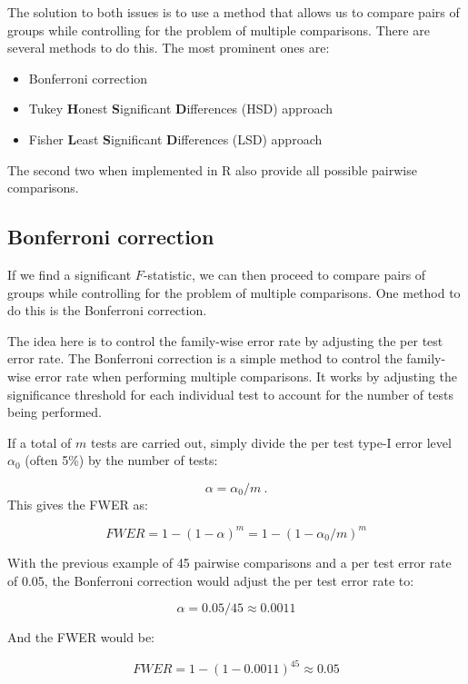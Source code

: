 \documentclass[
  letterpaper,
  8pt,
  a4paper]{book}
\providecommand{\tightlist}{%
  \setlength{\itemsep}{0pt}\setlength{\parskip}{0pt}}
\begin{document}
The solution to both issues is to use a method that allows us to compare
pairs of groups while controlling for the problem of multiple
comparisons. There are several methods to do this. The most prominent
ones are:

\begin{itemize}
\tightlist
\item
  Bonferroni correction
\item
  Tukey \textbf{H}onest \textbf{S}ignificant \textbf{D}ifferences (HSD)
  approach
\item
  Fisher \textbf{L}east \textbf{S}ignificant \textbf{D}ifferences (LSD)
  approach
\end{itemize}

The second two when implemented in R also provide all possible pairwise
comparisons.

\subsection*{Bonferroni correction}\label{bonferroni-correction}

If we find a significant \(F\)-statistic, we can then proceed to compare
pairs of groups while controlling for the problem of multiple
comparisons. One method to do this is the Bonferroni correction.

The idea here is to control the family-wise error rate by adjusting the
per test error rate. The Bonferroni correction is a simple method to
control the family-wise error rate when performing multiple comparisons.
It works by adjusting the significance threshold for each individual
test to account for the number of tests being performed.

If a total of \(m\) tests are carried out, simply divide the per test
type-I error level \(\alpha_0\) (often 5\%) by the number of tests:

\[\alpha = \alpha_0 / m \ .\] This gives the FWER as:

\[FWER = 1 - (1 - \alpha)^m = 1 - (1 - \alpha_0 / m)^m\]

With the previous example of 45 pairwise comparisons and a per test
error rate of 0.05, the Bonferroni correction would adjust the per test
error rate to:

\[\alpha = 0.05 / 45 \approx 0.0011\]

And the FWER would be:

\[FWER = 1 - (1 - 0.0011)^{45} \approx 0.05\]
\end{document}
